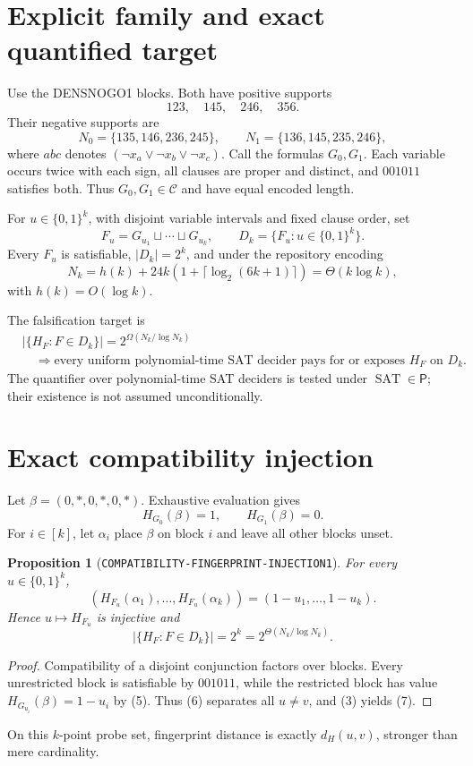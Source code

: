 \documentclass[11pt]{article}
\newtheorem{proposition}{Proposition}
\newcommand{\Core}{\mathcal C}
\begin{document}
\section{Explicit family and exact quantified target}
Use the DENSNOGO1 blocks.  Both have positive supports
\[
123,\quad145,\quad246,\quad356.
\]
Their negative supports are
\[
N_0=\{135,146,236,245\},\qquad N_1=\{136,145,235,246\},
\]
where \(abc\) denotes
\((\neg x_a\vee\neg x_b\vee\neg x_c)\).  Call the formulas \(G_0,G_1\).
Each variable occurs twice with each sign, all clauses are proper and
distinct, and \(001011\) satisfies both.  Thus \(G_0,G_1\in\Core\) and have
equal encoded length.

For \(u\in\{0,1\}^k\), with disjoint variable intervals and fixed clause
order, set
\[
F_u=G_{u_1}\sqcup\cdots\sqcup G_{u_k},\qquad
D_k=\{F_u:u\in\{0,1\}^k\}.                              \tag{2}
\]
Every \(F_u\) is satisfiable, \(|D_k|=2^k\), and under the repository encoding
\[
N_k=h(k)+24k(1+\lceil\log_2(6k+1)\rceil)=\Theta(k\log k), \tag{3}
\]
with \(h(k)=O(\log k)\).

The falsification target is
\begin{equation}
\begin{split}
&|\{H_F:F\in D_k\}|=2^{\Omega(N_k/\log N_k)}\\
&\quad\Longrightarrow
\text{every uniform polynomial-time SAT decider pays for or exposes }H_F
\text{ on }D_k.
\end{split}
\tag{4}
\end{equation}
The quantifier over polynomial-time SAT deciders is tested under
\(\operatorname{SAT}\in\mathsf P\); their existence is not assumed
unconditionally.

\section{Exact compatibility injection}
Let \(\beta=(0,*,0,*,0,*)\).  Exhaustive evaluation gives
\[
H_{G_0}(\beta)=1,\qquad H_{G_1}(\beta)=0.                 \tag{5}
\]
For \(i\in[k]\), let \(\alpha_i\) place \(\beta\) on block \(i\) and leave
all other blocks unset.

\begin{proposition}[\texttt{COMPATIBILITY-FINGERPRINT-INJECTION1}]
For every \(u\in\{0,1\}^k\),
\[
(H_{F_u}(\alpha_1),\ldots,H_{F_u}(\alpha_k))
 =(1-u_1,\ldots,1-u_k).                                  \tag{6}
\]
Hence \(u\mapsto H_{F_u}\) is injective and
\[
|\{H_F:F\in D_k\}|=2^k=2^{\Theta(N_k/\log N_k)}.          \tag{7}
\]
\end{proposition}
\begin{proof}
Compatibility of a disjoint conjunction factors over blocks.  Every
unrestricted block is satisfiable by \(001011\), while the restricted block
has value \(H_{G_{u_i}}(\beta)=1-u_i\) by (5).  Thus (6) separates all
\(u\ne v\), and (3) yields (7).
\end{proof}
On this \(k\)-point probe set, fingerprint distance is exactly
\(d_H(u,v)\), stronger than mere cardinality.
\end{document}
